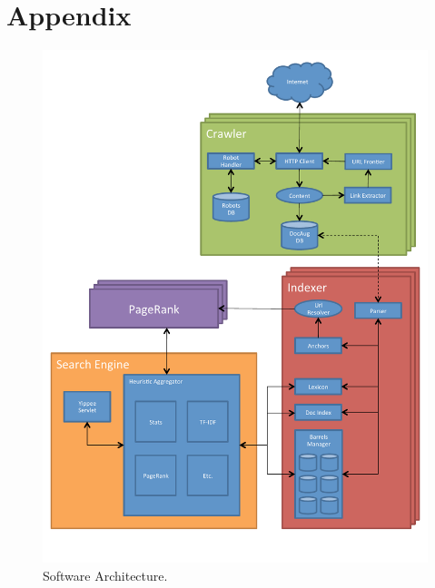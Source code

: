 \documentclass[11pt, letterpaper, oneside, twocolumn]{article}
\begin{document}
\section{Appendix}
\label{sec:SOAR} %
\begin{figure}[t]
  \centering
  \includegraphics[scale=0.40]{figures/yippee_map.pdf}
  \caption{Software Architecture.}
\end{figure}
\end{document}
